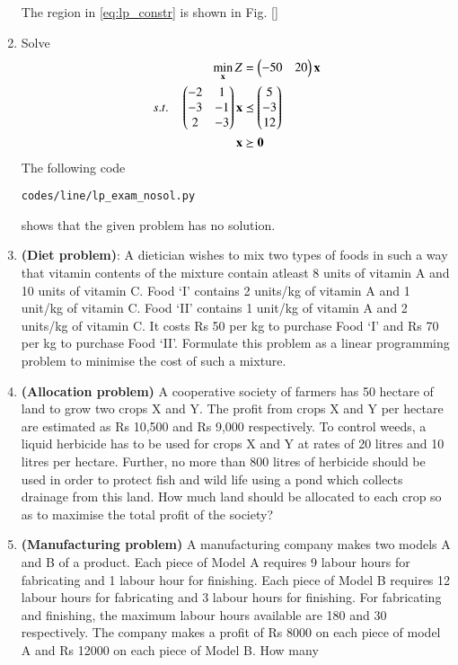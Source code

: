\begin{enumerate}[label=\arabic*.,ref=\thesection.\theenumi]
The region in \eqref{eq:lp_constr} is shown in Fig. \ref{}
\item Solve
\begin{align}
\min_{\mathbf{x}} Z &= \begin{pmatrix}-50 & 20\end{pmatrix}\mathbf{x}
\\
s.t. \quad 
\begin{pmatrix}
-2 & 1
\\
-3 & -1
\\
2 & -3
\end{pmatrix}
\mathbf{x} &\preceq \begin{pmatrix}5\\-3\\12\end{pmatrix}
\\
\mathbf{x} &\succeq \mathbf{0}
\end{align}
%
\solution The following code 
\begin{lstlisting}
codes/line/lp_exam_nosol.py
\end{lstlisting}
%
shows that the given problem has no solution.
\item\textbf {(Diet problem)}: A dietician wishes to mix two types of foods in such a
way that vitamin contents of the mixture contain atleast 8 units of vitamin A and 10
units of vitamin C. Food ‘I’ contains 2 units/kg of vitamin A and 1 unit/kg of vitamin C.
Food ‘II’ contains 1 unit/kg of vitamin A and 2 units/kg of vitamin C. It costs
Rs 50 per kg to purchase Food ‘I’ and Rs 70 per kg to purchase Food ‘II’. Formulate
this problem as a linear programming problem to minimise the cost of such a mixture.\\
\item \textbf{(Allocation problem)} A cooperative society of farmers has 50 hectare
of land to grow two crops X and Y. The profit from crops X and Y per hectare are
estimated as Rs 10,500 and Rs 9,000 respectively. To control weeds, a liquid herbicide
has to be used for crops X and Y at rates of 20 litres and 10 litres per hectare. Further,
no more than 800 litres of herbicide should be used in order to protect fish and wild life
using a pond which collects drainage from this land. How much land should be allocated
to each crop so as to maximise the total profit of the society?\\
\item  \textbf{(Manufacturing problem)} A manufacturing company makes two models
A and B of a product. Each piece of Model A requires 9 labour hours for fabricating
and 1 labour hour for finishing. Each piece of Model B requires 12 labour hours for
fabricating and 3 labour hours for finishing. For fabricating and finishing, the maximum
labour hours available are 180 and 30 respectively. The company makes a profit of
Rs 8000 on each piece of model A and Rs 12000 on each piece of Model B. How many

\end{enumerate}
